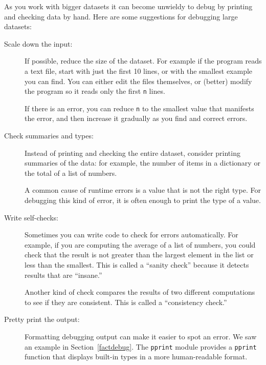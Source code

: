 \documentclass[10pt]{book}
\begin{document}
As you work with bigger datasets it can become unwieldy to
debug by printing and checking data by hand.  Here are some
suggestions for debugging large datasets:

\begin{description}

\item[Scale down the input:] If possible, reduce the size of the
dataset.  For example if the program reads a text file, start with
just the first 10 lines, or with the smallest example you can find.
You can either edit the files themselves, or (better) modify the
program so it reads only the first {\tt n} lines.

If there is an error, you can reduce {\tt n} to the smallest
value that manifests the error, and then increase it gradually
as you find and correct errors.

\item[Check summaries and types:] Instead of printing and checking the
entire dataset, consider printing summaries of the data: for example,
the number of items in a dictionary or the total of a list of numbers.

A common cause of runtime errors is a value that is not the right
type.  For debugging this kind of error, it is often enough to print
the type of a value.

\item[Write self-checks:]  Sometimes you can write code to check
for errors automatically.  For example, if you are computing the
average of a list of numbers, you could check that the result is
not greater than the largest element in the list or less than
the smallest.  This is called a ``sanity check'' because it detects
results that are ``insane.''


Another kind of check compares the results of two different
computations to see if they are consistent.  This is called a
``consistency check.''

\item[Pretty print the output:] Formatting debugging output
can make it easier to spot an error.  We saw an example in
Section~\ref{factdebug}.  The {\tt pprint} module provides
a {\tt pprint} function that displays built-in types in
a more human-readable format.


\end{description}
\end{document}
